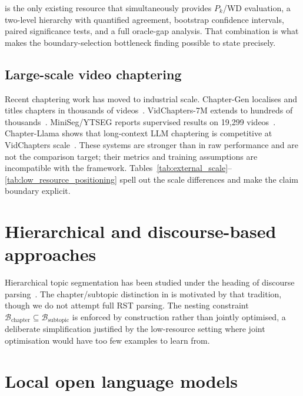 \dataset{} is the only existing resource that simultaneously provides
$P_k$/WD evaluation, a two-level hierarchy with quantified agreement,
bootstrap confidence intervals, paired significance tests, and a full
oracle-gap analysis. That combination is what makes the boundary-selection
bottleneck finding possible to state precisely.

\subsection{Large-scale video chaptering}

Recent chaptering work has moved to industrial scale. Chapter-Gen localises
and titles chapters in thousands of
videos~\cite{cao2022_chaptergen}. VidChapters-7M extends to hundreds of
thousands~\cite{yang2023_vidchapters}.
MiniSeg/YTSEG reports supervised results on 19,299
videos~\cite{retkowski2024_miniseg}. Chapter-Llama shows that long-context LLM
chaptering is competitive at VidChapters
scale~\cite{ventura2025_chapterllama}. These systems are stronger than
\lecseg{} in raw performance and are not the comparison target; their metrics
and training assumptions are incompatible with the \lecseg{} framework.
Tables~\ref{tab:external_scale}--\ref{tab:low_resource_positioning} spell out
the scale differences and make the claim boundary explicit.





\section{Hierarchical and discourse-based approaches}
\label{sec:hierarchical_lit}

Hierarchical topic segmentation has been studied under the heading of discourse
parsing~\cite{mann1988rst}. The chapter/subtopic distinction in \lecseg{} is
motivated by that tradition, though we do not attempt full RST parsing. The
nesting constraint
$\mathcal{B}_{\text{chapter}} \subseteq \mathcal{B}_{\text{subtopic}}$
is enforced by construction rather than jointly optimised, a deliberate
simplification justified by the low-resource setting where joint optimisation
would have too few examples to learn from.

\section{Local open language models}
\label{sec:llm_lit}

